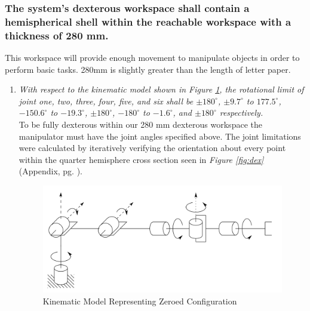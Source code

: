 \documentclass[12pt]{report}
\begin{document}
\subsubsection{The system’s dexterous workspace shall contain a hemispherical shell within the reachable workspace with a thickness of 280 mm.}
This workspace will provide enough movement to manipulate objects in order to perform basic tasks. 280mm is slightly greater than the length of letter paper.
\begin{enumerate}[label=\thesubsubsection.\alph*,leftmargin=3cm,font=\itshape]
  \item \textit{With respect to the kinematic model shown in Figure \ref{fig:zero}, the rotational limit of joint one, two, three, four, five, and six shall be \(\pm180^{\circ}\), \(\pm9.7^{\circ}\) to \(177.5^{\circ}\), \(-150.6^{\circ}\) to \(-19.3^{\circ}\), \(\pm180^{\circ}\), \(-180^{\circ}\) to \(-1.6^{\circ}\), and \(\pm180^{\circ}\) respectively.} \\
  To be fully dexterous within our 280 mm dexterous workspace the manipulator must have the joint angles specified above. The joint limitations were calculated by iteratively verifying the orientation about every point within the quarter hemisphere cross section seen in \emph{Figure \ref{fig:dex}} (Appendix, pg. \pageref{sec:app}).
  \begin{figure}[htp]
    \centering
    \includegraphics[width=.75\textwidth]{zero}
    \caption{Kinematic Model Representing Zeroed Configuration \cite{robo}}
    \label{fig:zero}
  \end{figure}
\end{enumerate}
\end{document}
